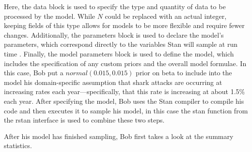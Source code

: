 \documentclass[
  12pt,
  twoside]{book}
\newenvironment{Shaded}{\begin{snugshade}}{\end{snugshade}}
\newcommand{\AttributeTok}[1]{\textcolor[rgb]{0.77,0.63,0.00}{#1}}
\newcommand{\DecValTok}[1]{\textcolor[rgb]{0.00,0.00,0.81}{#1}}
\newcommand{\FunctionTok}[1]{\textcolor[rgb]{0.00,0.00,0.00}{#1}}
\newcommand{\NormalTok}[1]{#1}
\newcommand{\OtherTok}[1]{\textcolor[rgb]{0.56,0.35,0.01}{#1}}
\newcommand{\SpecialCharTok}[1]{\textcolor[rgb]{0.00,0.00,0.00}{#1}}
\newcommand{\StringTok}[1]{\textcolor[rgb]{0.31,0.60,0.02}{#1}}
\theoremstyle{definition}
\theoremstyle{definition}
\theoremstyle{definition}
\theoremstyle{remark}
\begin{document}
Here, the data block is used to specify the type and quantity of data to be processed by the model.
While \(N\) could be replaced with an actual integer, keeping fields of this type allows for models to be more flexible and require fewer changes.
Additionally, the parameters block is used to declare the model's parameters, which correspond directly to the variables Stan will sample at run time \citep[  8.1]{StanManual2016}.
Finally, the model parameters block is used to define the model, which includes the specification of any custom priors and the overall model formulae.
In this case, Bob put a \(normal(0.015,0.015)\) prior on beta to include into the model his domain-specific assumption that shark attacks are occurring at increasing rates each year---specifically, that this rate is increasing at about 1.5\% each year.
After specifying the model, Bob uses the Stan compiler to compile his code and then executes it to sample his model, in this case the stan function from the rstan interface is used to combine these two steps.

\begin{Shaded}
\end{Shaded}

After his model has finished sampling, Bob first takes a look at the summary statistics.

\begin{Shaded}
\end{Shaded}
\end{document}
